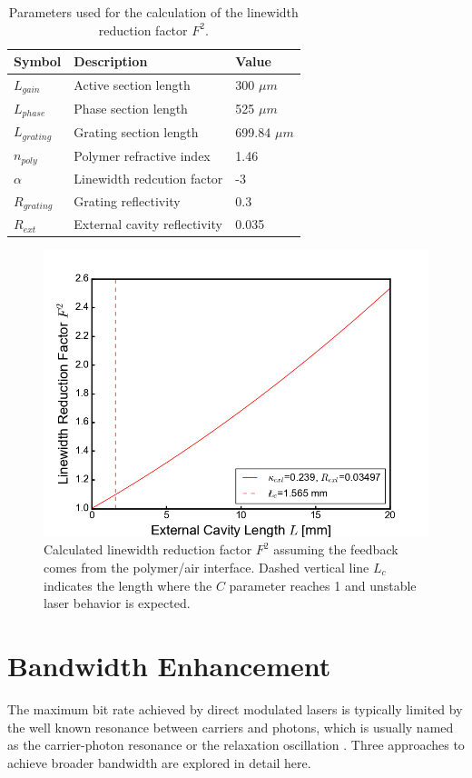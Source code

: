 \begin{table}[ht]
    \centering
    \caption{Parameters used for the calculation of the linewidth reduction factor $F^2$.}
    \begin{tabular}{@{}lll@{}}
    \toprule
    Symbol        & Description                  & Value           \\ \midrule
    $L_{gain}$    & Active section length        & 300 $\mu m$     \\
    $L_{phase}$   & Phase section length         & 525 $\mu m$     \\
    $L_{grating}$ & Grating section length       & 699.84 $\mu m$  \\
    $n_{poly}$    & Polymer refractive index     & 1.46            \\
    $\alpha$      & Linewidth redcution factor   & -3              \\
    $R_{grating}$ & Grating reflectivity         & 0.3             \\
    $R_{ext}$     & External cavity reflectivity & 0.035           \\ \bottomrule
    \end{tabular}
    \label{tab:F_reduction_factor}
\end{table}

\begin{figure}[ht]
    \centering
    \includegraphics[width=.7\linewidth]{figures/F_reduction_factor.png}
    \caption{Calculated linewidth reduction factor $F^2$ assuming the feedback comes from the polymer/air interface. Dashed vertical line $L_c$ indicates the length where the $C$ parameter reaches 1 and unstable laser behavior is expected.}
    \label{fig:F_reduction_factor}
\end{figure}

\section{Bandwidth Enhancement}\label{sec:bandwidth_enhancement}
The maximum bit rate achieved by direct modulated lasers is typically limited by the well known resonance between carriers and photons, which is usually named as the carrier-photon resonance or the relaxation oscillation \cite{coldren2012diode}. Three approaches to achieve broader bandwidth are explored in detail here. 

